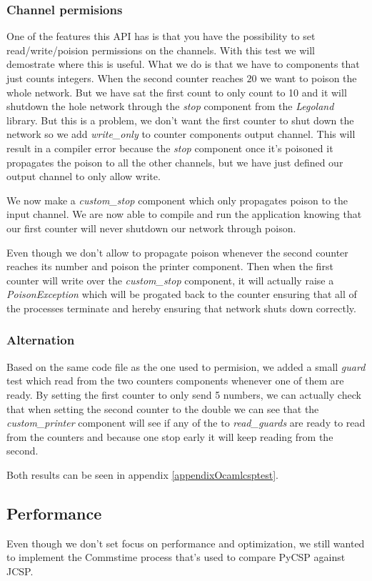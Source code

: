 \documentclass[a4paper,12pt]{article}
\begin{document}
\subsubsection{Channel permisions}
One of the features this API has is that you have the possibility to set 
read/write/poision permissions on the channels. With this test we will
demostrate where this is useful. What we do is that we have to components
that just counts integers. When the second counter reaches $20$ we want
to poison the whole network. But we have sat the first count to only count
to 10 and it will shutdown the hole network through the {\it stop}
component from the {\it Legoland} library. But this is a problem, we don't
want the first counter to shut down the network so we add {\it write\_only}
to counter components output channel. This will result in a compiler error
because the {\it stop} component once it's poisoned it propagates the poison
to all the other channels, but we have just defined our output channel to
only allow write.

We now make a {\it custom\_stop} component which only propagates poison to
the input channel. We are now able to compile and run the application knowing
that our first counter will never shutdown our network through poison.

Even though we don't allow to propagate poison whenever the second counter
reaches its number and poison the printer component. Then when the first
counter will write over the {\it custom\_stop} component, it will actually
raise a {\it PoisonException} which will be progated back to the counter
ensuring that all of the processes terminate and hereby ensuring that network
shuts down correctly.

\subsubsection{Alternation}
Based on the same code file as the one used to permision, we added a small
{\it guard} test which read from the two counters components whenever one of
them are ready. By setting the first counter to only send 5 numbers, we can
actually check that when setting the second counter to the double we can see
that the {\it custom\_printer} component will see if any of the to
{\it read\_guards} are ready to read from the counters and because one stop
early it will keep reading from the second.

Both results can be seen in appendix \ref{appendixOcamlcsptest}.

\subsection{Performance}
\label{performance}
Even though we don't set focus on performance and optimization, we still wanted
to implement the Commstime\cite{vinterpycsp} process that's used to compare
PyCSP against JCSP.
\end{document}
